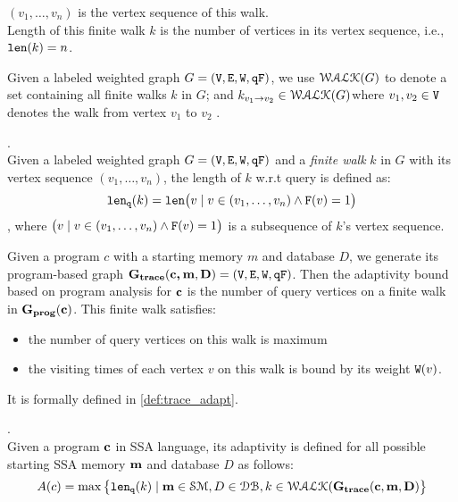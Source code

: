 {{\begin{defn}
\begin{itemize}
\end{itemize}
$(v_1, \ldots, v_{n})$ is the vertex sequence of this walk.
\\
%
Length of this finite walk $k$ is the number of vertices in its vertex sequence, i.e., $\mathtt{len}(k) = n$.
\end{defn}
%
Given a labeled weighted graph $G = (\mathtt{V}, \mathtt{E}, \mathtt{W}, \mathtt{qF})$, 
we use $\mathcal{WALK}(G)$ to denote a set containing all finite walks $k$ in $G$;
and $k_{v_1 \to v_2} \in \mathcal{WALK}(G)$where $v_1, v_2 \in \mathtt{V}$ denotes the walk from vertex $v_1$ to $v_2$ .
%
%
\begin{defn}.
\label{def:qlen}
\\
Given a labeled weighted graph $G = (\mathtt{V}, \mathtt{E}, \mathtt{W}, \mathtt{qF})$ and a \emph{finite walk} $k$ in $G$ with its vertex sequence $(v_1, \ldots, v_{n})$, the length of $k$ w.r.t query is defined as:
\[
  \mathtt{len}_{\tt q}(k) = \mathtt{len}\big(
  v \mid v \in (v_1, \ldots, v_{n}) \land \mathtt{F}(v) = 1 \big)
\]
, where $\big(v \mid v \in (v_1, \ldots, v_{n}) \land \mathtt{F}(v) = 1 \big)$ is a subsequence of $k$'s vertex sequence.
\end{defn}
%
Given a program $c$ with a starting memory $m$ and database $D$, we generate its program-based graph 
$\bf{G_{trace}}({\boldsymbol{\mathbf{c, m}}}, D) = (\mathtt{V}, \mathtt{E}, \mathtt{W}, \mathtt{qF})$.
%
Then the adaptivity bound based on program analysis for ${\boldsymbol{\mathbf{c}}}$ is the number of query vertices on a finite walk in $\mathtt{\bf{G_{prog}}}({\boldsymbol{\mathbf{c}}})$. This finite walk satisfies:
%
\begin{itemize}
\item the number of query vertices on this walk is maximum
\item the visiting times of each vertex $v$ on this walk is bound by its weight $\mathtt{W}(v)$.
\end{itemize}
%
It is formally defined in \ref{def:trace_adapt}.
%
\begin{defn}
.
\label{def:trace_adapt}
\\
Given a program ${\boldsymbol{\mathbf{c}}}$ in SSA language, 
its adaptivity is defined for all possible starting SSA memory ${\boldsymbol{\mathbf{m}}}$ and database $D$ as follows:
%
$$
A(c) = \max \big 
\{ \mathtt{len}_{\tt q}(k) \mid {\boldsymbol{\mathbf{m}}} \in \mathcal{SM},D \in \mathcal{DB} , k \in \mathcal{WALK}(\bf{G_{trace}}(c, m, D) \big \} 
$$
\end{defn}
}
\\
%
%
%
%
}
